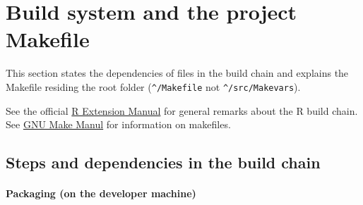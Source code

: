 \documentclass[12pt, a4paper]{article}
\renewcommand{\=}{\,=\,}
\newcommand{\+}{\,+\,}
\begin{document}
\section{Build system and the project Makefile}

This section states the dependencies of files in the build chain and explains
the Makefile residing the root folder (\texttt{\^{}/Makefile} not
\texttt{\^{}/src/Makevars}).

See the official
\href{https://cran.r-project.org/doc/manuals/R-exts.html}{R Extension Manual}
for general remarks about the R build chain. See
\href{https://www.gnu.org/software/make/manual/make.html}{GNU Make Manul}
for information on makefiles.

\subsection{Steps and dependencies in the build chain}

\paragraph{Packaging (on the developer machine)}
\end{document}

